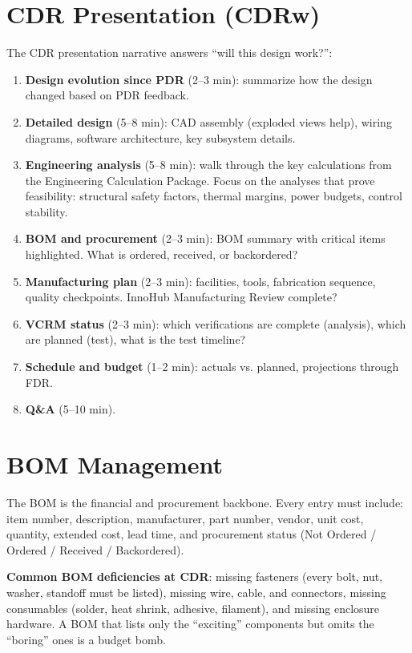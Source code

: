 \section{CDR Presentation (CDRw)}
The CDR presentation narrative answers ``will this design work?'':
\begin{enumerate}[nosep,leftmargin=1.5em]
\item \textbf{Design evolution since PDR} (2--3 min): summarize how the design changed based on PDR feedback.
\item \textbf{Detailed design} (5--8 min): CAD assembly (exploded views help), wiring diagrams, software architecture, key subsystem details.
\item \textbf{Engineering analysis} (5--8 min): walk through the key calculations from the Engineering Calculation Package. Focus on the analyses that prove feasibility: structural safety factors, thermal margins, power budgets, control stability.
\item \textbf{BOM and procurement} (2--3 min): BOM summary with critical items highlighted. What is ordered, received, or backordered?
\item \textbf{Manufacturing plan} (2--3 min): facilities, tools, fabrication sequence, quality checkpoints. InnoHub Manufacturing Review complete?
\item \textbf{VCRM status} (2--3 min): which verifications are complete (analysis), which are planned (test), what is the test timeline?
\item \textbf{Schedule and budget} (1--2 min): actuals vs. planned, projections through FDR.
\item \textbf{Q\&A} (5--10 min).
\end{enumerate}

\section{BOM Management}
The BOM is the financial and procurement backbone. Every entry must include: item number, description, manufacturer, part number, vendor, unit cost, quantity, extended cost, lead time, and procurement status (Not Ordered / Ordered / Received / Backordered).

\textbf{Common BOM deficiencies at CDR}: missing fasteners (every bolt, nut, washer, standoff must be listed), missing wire, cable, and connectors, missing consumables (solder, heat shrink, adhesive, filament), and missing enclosure hardware. A BOM that lists only the ``exciting'' components but omits the ``boring'' ones is a budget bomb.

